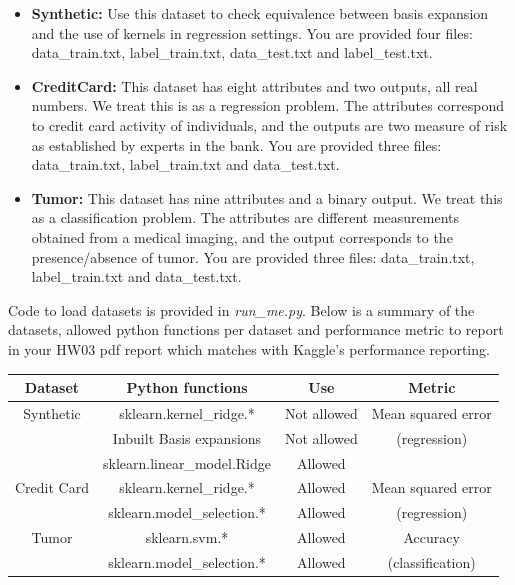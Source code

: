 \documentclass[11pt]{article}
\begin{document}
\begin{itemize}
\item \textbf{Synthetic:} Use this dataset to check equivalence between basis expansion and the use of kernels in regression settings. You are provided four files: data\_train.txt, label\_train.txt, data\_test.txt and label\_test.txt.
\item \textbf{CreditCard:} This dataset has eight attributes and two outputs, all real numbers. We treat this is as a regression problem. The attributes correspond to credit card activity of individuals, and the outputs are two measure of risk as established by experts in the bank. You are provided three files: data\_train.txt, label\_train.txt and data\_test.txt.
\item \textbf{Tumor:} This dataset has nine attributes and a binary output. We treat this as a classification problem. The attributes are different measurements obtained from a medical imaging, and the output corresponds to the presence/absence of tumor. You are provided three files: data\_train.txt, label\_train.txt and data\_test.txt.
\end{itemize}

Code to load datasets is provided in \textit{run\_me.py}. Below is a summary of the datasets, allowed python functions per dataset and performance metric to report in your HW03 pdf report which matches with Kaggle's performance reporting.

\begin{table}[H]
\centering
\begin{tabular}{|c|c|c|c|}\hline
\textbf{Dataset} & \textbf{Python functions} & \textbf{Use} & \textbf{Metric} \\\hline
Synthetic & sklearn.kernel\_ridge.* & Not allowed & Mean squared error \\
          & Inbuilt Basis expansions & Not allowed & (regression) \\
          & sklearn.linear\_model.Ridge & Allowed & \\\hline
Credit Card & sklearn.kernel\_ridge.* & Allowed & Mean squared error \\
	    & sklearn.model\_selection.* & Allowed & (regression) \\\hline
Tumor & sklearn.svm.* & Allowed & Accuracy \\
      & sklearn.model\_selection.* & Allowed & (classification)\\\hline
\end{tabular}
\end{table}
\end{document}
